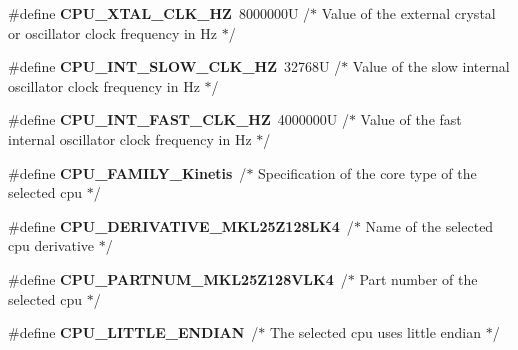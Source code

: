 \begin{DoxyCompactItemize}
\item 
\hypertarget{group___cpu__module_gacf80ae1c70da6f1932185345fb089ce2}{\#define {\bfseries C\-P\-U\-\_\-\-X\-T\-A\-L\-\_\-\-C\-L\-K\-\_\-\-H\-Z}~8000000\-U /$\ast$ Value of the external crystal or oscillator clock frequency in Hz $\ast$/}\label{group___cpu__module_gacf80ae1c70da6f1932185345fb089ce2}

\item 
\hypertarget{group___cpu__module_ga925e4835a9fdb52f03bd354d62d6ba0a}{\#define {\bfseries C\-P\-U\-\_\-\-I\-N\-T\-\_\-\-S\-L\-O\-W\-\_\-\-C\-L\-K\-\_\-\-H\-Z}~32768\-U /$\ast$ Value of the slow internal oscillator clock frequency in Hz  $\ast$/}\label{group___cpu__module_ga925e4835a9fdb52f03bd354d62d6ba0a}

\item 
\hypertarget{group___cpu__module_ga741ad9275688de8051f4bebd98a682bc}{\#define {\bfseries C\-P\-U\-\_\-\-I\-N\-T\-\_\-\-F\-A\-S\-T\-\_\-\-C\-L\-K\-\_\-\-H\-Z}~4000000\-U /$\ast$ Value of the fast internal oscillator clock frequency in Hz  $\ast$/}\label{group___cpu__module_ga741ad9275688de8051f4bebd98a682bc}

\item 
\hypertarget{group___cpu__module_ga5bf3022570d9bb7a0d666f2dd9db6a34}{\#define {\bfseries C\-P\-U\-\_\-\-F\-A\-M\-I\-L\-Y\-\_\-\-Kinetis}~/$\ast$ Specification of the core type of the selected cpu $\ast$/}\label{group___cpu__module_ga5bf3022570d9bb7a0d666f2dd9db6a34}

\item 
\hypertarget{group___cpu__module_ga2a3e9dd6039080eb14febb4170e28908}{\#define {\bfseries C\-P\-U\-\_\-\-D\-E\-R\-I\-V\-A\-T\-I\-V\-E\-\_\-\-M\-K\-L25\-Z128\-L\-K4}~/$\ast$ Name of the selected cpu derivative $\ast$/}\label{group___cpu__module_ga2a3e9dd6039080eb14febb4170e28908}

\item 
\hypertarget{group___cpu__module_gac7935d3a36bc77e04bc16409e9ecdec3}{\#define {\bfseries C\-P\-U\-\_\-\-P\-A\-R\-T\-N\-U\-M\-\_\-\-M\-K\-L25\-Z128\-V\-L\-K4}~/$\ast$ Part number of the selected cpu $\ast$/}\label{group___cpu__module_gac7935d3a36bc77e04bc16409e9ecdec3}

\item 
\hypertarget{group___cpu__module_gab62ca27d0a6a531f35842a6e3a94b454}{\#define {\bfseries C\-P\-U\-\_\-\-L\-I\-T\-T\-L\-E\-\_\-\-E\-N\-D\-I\-A\-N}~/$\ast$ The selected cpu uses little endian $\ast$/}\label{group___cpu__module_gab62ca27d0a6a531f35842a6e3a94b454}


\end{DoxyCompactItemize}
